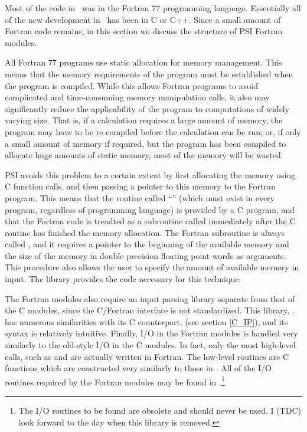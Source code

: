 %
%
%
%
Most of the code in \PSItwo\ was in the Fortran 77 programming
language.  Essentially all of the new development in \PSIthree\ has
been in C or C++.  Since a small amount of Fortran code remains, in
this section we discuss the structure of PSI Fortran modules.

All Fortran 77 programs use static allocation for memory management.
This means that the memory requirements of the program must be
established when the program is compiled.  While this allows Fortran
programs to avoid complicated and time-consuming memory manipulation
calls, it also may significantly reduce the applicability of the
program to computations of widely varying size.  That is, if a
calculation requires a large amount of memory, the program may have to
be re-compiled before the calculation can be run; or, if only a small
amount of memory if required, but the program has been compiled to
allocate huge amounts of static memory, most of the memory will be
wasted.

PSI avoids this problem to a certain extent by first allocating the
memory using C function calls, and then passing a pointer to this
memory to the Fortran program.  This means that the routine called
``'' (which must exist in every program, regardless of
programming language) is provided by a C program, and that the Fortran
code is treadted as a subroutine called immediately after the C
routine has finished the memory allocation.  The Fortran subroutine is
always called , and it requires a pointer to the
beginning of the available memory and the size of the memory in double
precision floating point words as arguments.  This procedure also
allows the user to specify the amount of available memory in input.
The  library provides the code necessary for this
technique.

The Fortran modules also require an input parsing library separate
from that of the C modules, since the C/Fortran interface is not
standardized.  This library, , has numerous
similarities with its C counterpart,  (see section
\ref{C_IP}), and its syntax is relatively intuitive.  Finally, I/O in
the Fortran modules is handled very similarly to the old-style I/O in
the C modules.  In fact, only the most high-level calls, such as
 and  are actually written in Fortran.
The low-level routines are C functions which are constructed very
similarly to those in .  All of the I/O routines
required by the Fortran modules may be found in .\footnote{The I/O routines to be found  are
obsolete and should never be used.  I (TDC) look forward to the day
when this library is removed.}

